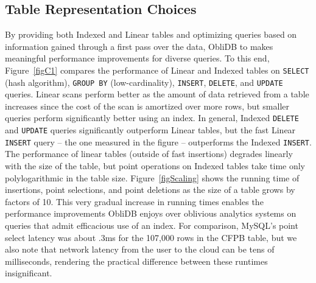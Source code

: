 \documentclass[letterpaper,twocolumn,10pt]{article}
\def\name/{ObliDB}
\begin{document}
\subsection{Table Representation Choices}
By providing both Indexed and Linear tables and optimizing queries based on information gained through a first pass over the data, \name/ to makes meaningful performance improvements for diverse queries. To this end, Figure~\ref{figC1} compares the performance of Linear and Indexed tables on \texttt{SELECT} (hash algorithm), \texttt{GROUP BY} (low-cardinality), \texttt{INSERT}, \texttt{DELETE}, and \texttt{UPDATE} queries. Linear scans perform better as the amount of data retrieved from a table increases since the cost of the scan is amortized over more rows, but smaller queries perform significantly better using an index. In general, Indexed \texttt{DELETE} and \texttt{UPDATE} queries significantly outperform Linear tables, but the fast Linear \texttt{INSERT} query -- the one measured in the figure -- outperforms the Indexed \texttt{INSERT}. The performance of linear tables (outside of fast insertions) degrades linearly with the size of the table, but point operations on Indexed tables take time only polylogarithmic in the table size. Figure~\ref{figScaling} shows the running time of insertions, point selections, and point deletions as the size of a table grows by factors of 10. This very gradual increase in running times enables the performance improvements \name/ enjoys over oblivious analytics systems on queries that admit efficacious use of an index. For comparison, MySQL’s point select latency was about .3ms for the 107,000 rows in the CFPB table, but we also note that network latency from the user to the cloud can be tens of milliseconds, rendering the practical difference between these runtimes insignificant.
\end{document}

